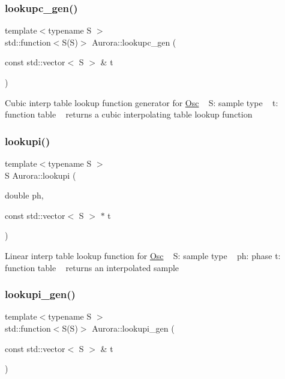 \subsubsection{\texorpdfstring{lookupc\+\_\+gen()}{lookupc\_gen()}}
{\footnotesize\ttfamily template$<$typename S $>$ \\
std\+::function$<$S(S)$>$ Aurora\+::lookupc\+\_\+gen (\begin{DoxyParamCaption}\item[{const std\+::vector$<$ S $>$ \&}]{t }\end{DoxyParamCaption})}

Cubic interp table lookup function generator for \hyperlink{class_aurora_1_1_osc}{Osc} ~\newline
S\+: sample type ~\newline
t\+: function table ~\newline
returns a cubic interpolating table lookup function \mbox{\label{namespace_aurora_a9246ac499667da52a0d1750e5238c4a8}} 
\subsubsection{\texorpdfstring{lookupi()}{lookupi()}}
{\footnotesize\ttfamily template$<$typename S $>$ \\
S Aurora\+::lookupi (\begin{DoxyParamCaption}\item[{double}]{ph,  }\item[{const std\+::vector$<$ S $>$ $\ast$}]{t }\end{DoxyParamCaption})\hspace{0.3cm}{\ttfamily [inline]}}

Linear interp table lookup function for \hyperlink{class_aurora_1_1_osc}{Osc} ~\newline
S\+: sample type ~\newline
ph\+: phase  t\+: function table ~\newline
returns an interpolated sample \mbox{\label{namespace_aurora_a043c55515e053a8d6f31ed7077a1bea6}} 
\subsubsection{\texorpdfstring{lookupi\+\_\+gen()}{lookupi\_gen()}}
{\footnotesize\ttfamily template$<$typename S $>$ \\
std\+::function$<$S(S)$>$ Aurora\+::lookupi\+\_\+gen (\begin{DoxyParamCaption}\item[{const std\+::vector$<$ S $>$ \&}]{t }\end{DoxyParamCaption})}

